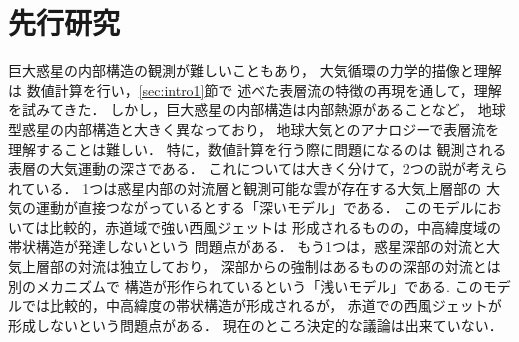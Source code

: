 \documentclass[a4j,12pt,openbib,oneside]{jreport}
\begin{document}
\section{先行研究}
\label{sec:intro2}
巨大惑星の内部構造の観測が難しいこともあり，
大気循環の力学的描像と理解は
数値計算を行い，\ref{sec:intro1}節で
述べた表層流の特徴の再現を通して，理解を試みてきた．
%
しかし，巨大惑星の内部構造は内部熱源があることなど，
地球型惑星の内部構造と大きく異なっており，
地球大気とのアナロジーで表層流を理解することは難しい．
特に，数値計算を行う際に問題になるのは
観測される表層の大気運動の深さである．
これについては大きく分けて，2つの説が考えられている．
%
1つは惑星内部の対流層と観測可能な雲が存在する大気上層部の
大気の運動が直接つながっているとする「深いモデル」である．
このモデルにおいては比較的，赤道域で強い西風ジェットは
形成されるものの，中高緯度域の帯状構造が発達しないという
問題点がある\citep{CHRISTENSEN2002}．
%
もう1つは，惑星深部の対流と大気上層部の対流は独立しており，
深部からの強制はあるものの深部の対流とは別のメカニズムで
構造が形作られているという「浅いモデル」である.
このモデルでは比較的，中高緯度の帯状構造が形成されるが，
赤道での西風ジェットが形成しないという問題点がある\citep{Scott2007}．
%
現在のところ決定的な議論は出来ていない．
%
%
\end{document}
